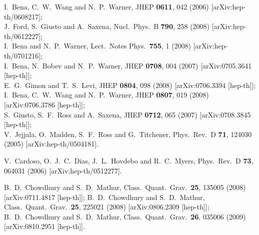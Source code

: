 \documentclass[11pt]{article}
\begin{document}
\begin{thebibliography}{10}
I.~Bena, C.~W.~Wang and N.~P.~Warner,
  JHEP {\bf 0611}, 042 (2006)
  [arXiv:hep-th/0608217];\\
J.~Ford, S.~Giusto and A.~Saxena,
  Nucl.\ Phys.\  B {\bf 790}, 258 (2008)
  [arXiv:hep-th/0612227];\\
I.~Bena and N.~P.~Warner,
  Lect.\ Notes Phys.\  {\bf 755}, 1 (2008)
  [arXiv:hep-th/0701216];\\
I.~Bena, N.~Bobev and N.~P.~Warner,
  JHEP {\bf 0708}, 004 (2007)
  [arXiv:0705.3641 [hep-th]];\\
E.~G.~Gimon and T.~S.~Levi,
  JHEP {\bf 0804}, 098 (2008)
  [arXiv:0706.3394 [hep-th]];\\
I.~Bena, C.~W.~Wang and N.~P.~Warner,
  JHEP {\bf 0807}, 019 (2008)
  [arXiv:0706.3786 [hep-th]];\\
  S.~Giusto, S.~F.~Ross and A.~Saxena,
  JHEP {\bf 0712}, 065 (2007)
  [arXiv:0708.3845 [hep-th]];\\


  
  V.~Jejjala, O.~Madden, S.~F.~Ross and G.~Titchener,
  Phys.\ Rev.\  D {\bf 71}, 124030 (2005)
  [arXiv:hep-th/0504181].

  V.~Cardoso, O.~J.~C.~Dias, J.~L.~Hovdebo and R.~C.~Myers,
  Phys.\ Rev.\  D {\bf 73}, 064031 (2006)
  [arXiv:hep-th/0512277].


  
  B.~D.~Chowdhury and S.~D.~Mathur,
  Class.\ Quant.\ Grav.\  {\bf 25}, 135005 (2008)
  [arXiv:0711.4817 [hep-th]];
  B.~D.~Chowdhury and S.~D.~Mathur,
  Class.\ Quant.\ Grav.\  {\bf 25}, 225021 (2008)
  [arXiv:0806.2309 [hep-th]];
  B.~D.~Chowdhury and S.~D.~Mathur,
  Class.\ Quant.\ Grav.\  {\bf 26}, 035006 (2009)
  [arXiv:0810.2951 [hep-th]].


\end{thebibliography}
\end{document}
